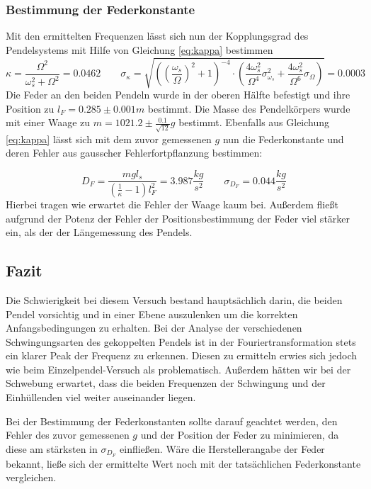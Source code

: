 \documentclass[a4paper, 11pt]{article}
\begin{document}
\subsubsection{Bestimmung der Federkonstante}
Mit den ermittelten Frequenzen lässt sich nun der Kopplungsgrad des Pendelsystems mit Hilfe von Gleichung \ref{eq:kappa} bestimmen
\begin{equation}
\kappa = \frac{\Omega^2}{\omega_s^2 + \Omega^2} = 0.0462 \qquad \sigma_{\kappa} = \sqrt{ \left( \left(\frac{\omega_s}{\Omega}\right)^2 + 1 \right)^{-4} \cdot \left(\frac{4\omega_s^2}{\Omega^4}\sigma_{\omega_s}^2 + \frac{4\omega_s^2}{\Omega^6}\sigma_{\Omega} \right) } = 0.0003
\end{equation}
Die Feder an den beiden Pendeln wurde in der oberen Hälfte befestigt und ihre Position zu $l_F = 0.285 \pm 0.001 m$ bestimmt. Die Masse des Pendelkörpers wurde mit einer Waage zu $m = 1021.2 \pm \frac{0.1}{\sqrt{12}} g$ bestimmt.
Ebenfalls aus Gleichung \ref{eq:kappa} lässt sich mit dem zuvor gemessenen $g$ nun die Federkonstante und deren Fehler aus gausscher Fehlerfortpflanzung bestimmen:

\begin{equation}
D_F = \frac{mgl_s}{\left(\frac{1}{\kappa}-1\right) l_F^2 } = 3.987 \frac{kg}{s^2} \qquad \sigma_{D_F} = 0.044 \frac{kg}{s^2}
\end{equation}
Hierbei tragen wie erwartet die Fehler der Waage kaum bei. Außerdem fließt aufgrund der Potenz der Fehler der Positionsbestimmung der Feder viel stärker ein, als der der Längemessung des Pendels.

\subsection{Fazit}
Die Schwierigkeit bei diesem Versuch bestand hauptsächlich darin, die beiden Pendel vorsichtig und in einer Ebene auszulenken um die korrekten Anfangsbedingungen zu erhalten.
Bei der Analyse der verschiedenen Schwingungsarten des gekoppelten Pendels ist in der Fouriertransformation stets ein klarer Peak der Frequenz zu erkennen. Diesen zu ermitteln erwies sich jedoch wie beim Einzelpendel-Versuch als problematisch. Außerdem hätten wir bei der Schwebung erwartet, dass die beiden Frequenzen der Schwingung und der Einhüllenden viel weiter auseinander liegen.

Bei der Bestimmung der Federkonstanten sollte darauf geachtet werden, den Fehler des zuvor gemessenen $g$ und der Position der Feder zu minimieren, da diese am stärksten in $\sigma_{D_F}$ einfließen. Wäre die Herstellerangabe der Feder bekannt, ließe sich der ermittelte Wert noch mit der tatsächlichen Federkonstante vergleichen.


\clearpage
\listoffigures
\end{document}
